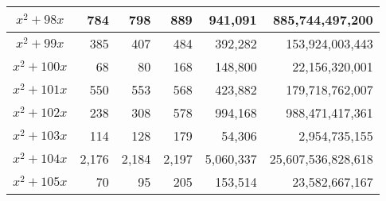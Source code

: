 \documentclass{article}
\begin{document}
\begin{center}
\begin{tabular}{ | c | r | r | r | r | r | }
$x^2 + 98x$ & 784 & 798 & 889 & 941{,}091 & 885{,}744{,}497{,}200 \\ \hline
$x^2 + 99x$ & 385 & 407 & 484 & 392{,}282 & 153{,}924{,}003{,}443 \\ \hline
$x^2 + 100x$ & 68 & 80 & 168 & 148{,}800 & 22{,}156{,}320{,}001 \\ \hline
$x^2 + 101x$ & 550 & 553 & 568 & 423{,}882 & 179{,}718{,}762{,}007 \\ \hline
$x^2 + 102x$ & 238 & 308 & 578 & 994{,}168 & 988{,}471{,}417{,}361 \\ \hline
$x^2 + 103x$ & 114 & 128 & 179 & 54{,}306 & 2{,}954{,}735{,}155 \\ \hline
$x^2 + 104x$ & 2{,}176 & 2{,}184 & 2{,}197 & 5{,}060{,}337 & 25{,}607{,}536{,}828{,}618 \\ \hline
$x^2 + 105x$ & 70 & 95 & 205 & 153{,}514 & 23{,}582{,}667{,}167 \\ \hline

\end{tabular}\pagebreak

\begin{tabular}{ | c | r | r | r | r | r | }
\hline


\end{tabular}
\end{center}
\end{document}
